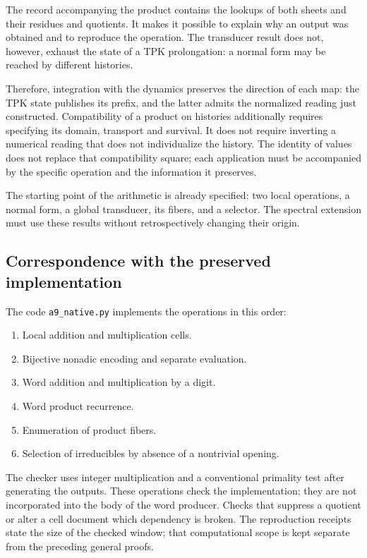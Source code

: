The record accompanying the product contains the lookups of both sheets and their residues and quotients. It makes it possible to explain why an output was obtained and to reproduce the operation. The transducer result does not, however, exhaust the state of a TPK prolongation: a normal form may be reached by different histories.

Therefore, integration with the dynamics preserves the direction of each map: the TPK state publishes its prefix, and the latter admits the normalized reading just constructed. Compatibility of a product on histories additionally requires specifying its domain, transport and survival. It does not require inverting a numerical reading that does not individualize the history. The identity of values does not replace that compatibility square; each application must be accompanied by the specific operation and the information it preserves.

The starting point of the arithmetic is already specified: two local operations, a normal form, a global transducer, its fibers, and a selector. The spectral extension must use these results without retrospectively changing their origin.

\subsection{Correspondence with the preserved implementation}
The code \texttt{a9\_\allowbreak{}native.\allowbreak{}py} implements the operations in this order:

\begin{enumerate}
\item Local addition and multiplication cells.
\item Bijective nonadic encoding and separate evaluation.
\item Word addition and multiplication by a digit.
\item Word product recurrence.
\item Enumeration of product fibers.
\item Selection of irreducibles by absence of a nontrivial opening.
\end{enumerate}
The checker uses integer multiplication and a conventional primality test after generating the outputs. These operations check the implementation; they are not incorporated into the body of the word producer. Checks that suppress a quotient or alter a cell document which dependency is broken. The reproduction receipts state the size of the checked window; that computational scope is kept separate from the preceding general proofs.
